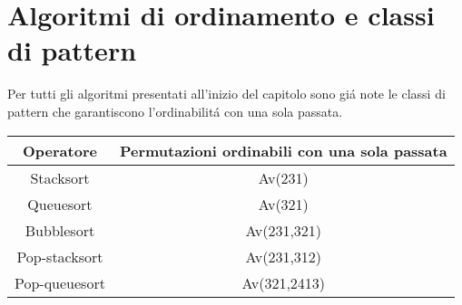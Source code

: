 \section{Algoritmi di ordinamento e classi di pattern}
Per tutti gli algoritmi presentati all'inizio del capitolo 
sono gi\'a note le classi di {pattern} che garantiscono l'ordinabilit\'a con una sola passata. 
\begin{center}
\begin{tabular}{ |c|c| } 
\hline
\textbf{Operatore} & \textbf{Permutazioni ordinabili con una sola passata} \\ 
\hline
Stacksort\cite{limbrief} & Av(231)\\ 
Queuesort\cite{cioni2021preimages} & Av(321)\\ 
Bubblesort\cite{albert2010inverse} & Av(231,321)\\ 
Pop-stacksort\cite{magnusson2013sorting} & Av(231,312)\\ 
Pop-queuesort\cite{cioni2021sorting}& Av(321,2413)\\ 
\hline
\end{tabular}
\end{center}
